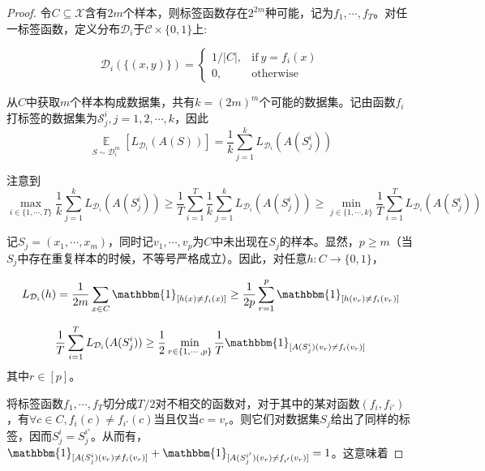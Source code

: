 \documentclass{article}
\newtheorem*{proof}{Proof}
\begin{document}
	\begin{proof}
	令$C\subseteq\mathcal{X}$含有$2m$个样本，则标签函数存在$2^{2m}$种可能，记为$f_1,\cdots,f_T$。对任一标签函数，定义分布$\mathcal{D}_i$于$\mathcal{C}\times\{0,1\}$上:
	
	\begin{equation*}
	\mathcal{D}_i(\{(x,y)\})=\left\{
	\begin{matrix} 1/|C|,& \mathrm{if}\ y=f_i(x) \\ 0,& \mathrm{otherwise} 
	\end{matrix}\right.
	\end{equation*}
	
	从$C$中获取$m$个样本构成数据集，共有$k=(2m)^m$个可能的数据集。记由函数$f_i$打标签的数据集为$\mathcal{S}_j^i, j=1,2,\cdots,k$，因此
	\begin{equation*}
	\mathop{\mathbb{E}}\limits_{S\sim\mathcal{D}_i^m}[L_{\mathcal{D}_i}(A(S))]=\frac{1}{k}\sum_{j=1}^kL_{\mathcal{D}_i}(A(S_j^i))
	\end{equation*}
	
注意到	
	\begin{equation*}
	\max_{i\in\{1,\cdots,T\}} \frac{1}{k}\sum_{j=1}^k L_{\mathcal{D}_i}(A(S_j^i)) \geq \frac{1}{T}\sum_{i=1}^T \frac{1}{k} \sum_{j=1}^k L_{\mathcal{D}_i}(A(S_j^i)) \geq \min_{j\in\{1,\cdots,k\}}\frac{1}{T}\sum_{i=1}^T L_{\mathcal{D}_i} (A(S_j^i))
	\end{equation*}

	记$S_j=(x_1,\cdots,x_m)$，同时记$v_1,\cdots,v_p$为$C$中未出现在$S_j$的样本。显然，$p\geq m$（当$S_j$中存在重复样本的时候，不等号严格成立）。因此，对任意$h:C\rightarrow\{0,1\}$，
	
	\begin{equation*}
	L_{\mathcal{D}_i}(h)=\frac{1}{2m}\sum_{x\in C}\mathbbm{1}_{[h(x)\neq f_i(x)]}\geq\frac{1}{2p}\sum_{r=1}^p\mathbbm{1}_{[h(v_r)\neq f_i(v_r)]}
	\end{equation*}

	\begin{equation*}
	\frac{1}{T}\sum_{i=1}^T L_{\mathcal{D}_i} (A(S_j^i))\geq\frac{1}{2}\min_{r\in\{1,\cdots,p\}}\frac{1}{T}\mathbbm{1}_{[A(S^i_j)(v_r)\neq f_i(v_r)]}
	\end{equation*}
其中$r\in[p]$。

	将标签函数$f_1,\cdots,f_T$切分成$T/2$对不相交的函数对，对于其中的某对函数$(f_i,f_{i'})$，有$\forall c\in C,f_i(c)\neq f_{i'}(c)$当且仅当$c=v_r$。则它们对数据集$S_j$给出了同样的标签，因而$S_j^i=S_j^{i'}$。从而有， $\mathbbm{1}_{[A(S_j^i)(v_r)\neq f_i(v_r)]}+\mathbbm{1}_{[A(S_j^{i'})(v_r)\neq f_{i'}(v_r)]}=1$。这意味着
	

\end{proof}
\end{document}
